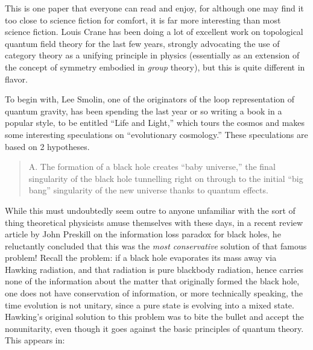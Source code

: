 \documentclass{article}
\def\tightlist{}
\renewcommand{\texttt}[1]{%
  \begingroup
  \ttfamily
  \begingroup\lccode`~=`/\lowercase{\endgroup\def~}{/\discretionary{}{}{}}%
  \begingroup\lccode`~=`[\lowercase{\endgroup\def~}{[\discretionary{}{}{}}%
  \begingroup\lccode`~=`.\lowercase{\endgroup\def~}{.\discretionary{}{}{}}%
  \catcode`/=\active\catcode`[=\active\catcode`.=\active
  \scantokens{#1\noexpand}%
  \endgroup
}
\begin{document}
\noindent
This is one paper that everyone can read and enjoy, for although one may
find it too close to science fiction for comfort, it is far more
interesting than most science fiction. Louis Crane has been doing a lot
of excellent work on topological quantum field theory for the last few
years, strongly advocating the use of category theory as a unifying
principle in physics (essentially as an extension of the concept of
symmetry embodied in \emph{group} theory), but this is quite different
in flavor.

To begin with, Lee Smolin, one of the originators of the loop
representation of quantum gravity, has been spending the last year or so
writing a book in a popular style, to be entitled ``Life and Light,''
which tours the cosmos and makes some interesting speculations on
``evolutionary cosmology.'' These speculations are based on 2
hypotheses.

\begin{quote}
A. The formation of a black hole creates ``baby universe,'' the final
singularity of the black hole tunnelling right on through to the initial
``big bang'' singularity of the new universe thanks to quantum effects.
\end{quote}

While this must undoubtedly seem outre to anyone unfamiliar with the
sort of thing theoretical physicists amuse themselves with these days,
in a recent review article by John Preskill on the information loss
paradox for black holes, he reluctantly concluded that this was the
\emph{most conservative} solution of that famous problem! Recall the
problem: if a black hole evaporates its mass away via Hawking radiation,
and that radiation is pure blackbody radiation, hence carries none of
the information about the matter that originally formed the black hole,
one does not have conservation of information, or more technically
speaking, the time evolution is not unitary, since a pure state is
evolving into a mixed state. Hawking's original solution to this problem
was to bite the bullet and accept the nonunitarity, even though it goes
against the basic principles of quantum theory. This appears in:
\end{document}
